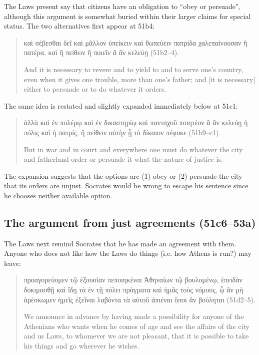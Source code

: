 \documentclass[12pt,letterpaper]{article}
\begin{document}
The Laws present say that citizens have an obligation to ``obey or persuade", although this argument is somewhat buried within their larger claims for special status. The two alternatives first appear at 51b4:

\begin{quote}

    \textgreek{καὶ σέβεσθαι δεῖ καὶ μᾶλλον ὑπείκειν καὶ θωπεύειν πατρίδα χαλεπαίνουσαν ἢ πατέρα, καὶ ἢ πείθειν ἢ ποιεῖν ἃ ἂν κελεύῃ} (51b2--4).

    And it is necessary to revere and to yield to and to serve one's country, even when it gives one trouble, more than one's father; and [it is necessary] either to persuade or to do whatever it orders.

\end{quote}

The same idea is restated and slightly expanded immediately below at 51c1:

\begin{quote}

    \textgreek{ἀλλὰ καὶ ἐν πολέμῳ καὶ ἐν δικαστηρίῳ καὶ πανταχοῦ ποιητέον ἃ ἂν κελεύῃ ἡ πόλις καὶ ἡ πατρίς, ἢ πείθειν αὐτὴν ᾗ τὸ δίκαιον πέφυκε} (51b9--c1).

    But in war and in court and everywhere one must do whatever the city and fatherland order or persuade it what the nature of justice is.

\end{quote}

The expansion suggests that the options are (1) obey or (2) persuade the city that its orders are unjust. Socrates would be wrong to escape his sentence since he chooses neither available option.



\subsection*{The argument from just agreements (51c6--53a)}

The Laws next remind Socrates that he has made an agreement with them. Anyone who does not like how the Laws do things (i.e. how Athens is run?) may leave:

\begin{quote}

    \textgreek{προαγορεύομεν τῷ ἐξουσίαν πεποιηκέναι Ἀθηναίων τῷ βουλομένῳ, ἐπειδὰν δοκιμασθῇ καὶ ἴδῃ τὰ ἐν τῇ πόλει πράγματα καὶ ἡμᾶς τοὺς νόμους, ᾧ ἂν μὴ ἀρέσκωμεν ἡμεῖς ἐξεῖναι λαβόντα τὰ αὑτοῦ ἀπιέναι ὅποι ἂν βούληται} (51d2--5).

    We announce in advance by having made a possibility for anyone of the Athenians who wants when he comes of age and see the affairs of the city and us Laws, to whomever we are not pleasant, that it is possible to take his things and go wherever he wishes.

\end{quote}
\end{document}
